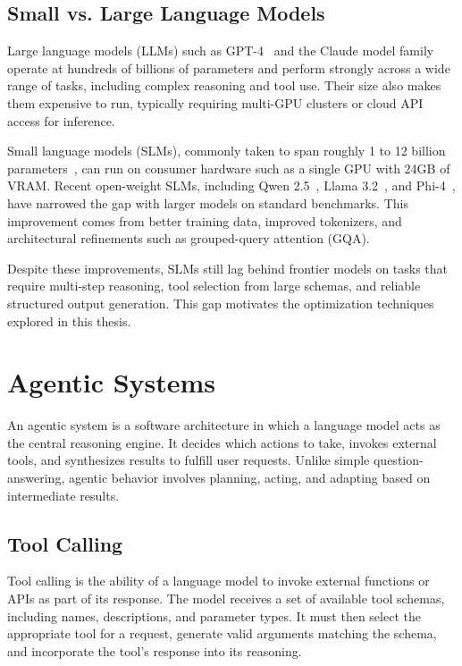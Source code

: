 \subsection{Small vs. Large Language Models}

Large language models (LLMs) such as GPT-4~\cite{openai2023gpt4} and the Claude model family operate at hundreds of billions of parameters and perform strongly across a wide range of tasks, including complex reasoning and tool use. Their size also makes them expensive to run, typically requiring multi-GPU clusters or cloud API access for inference.

Small language models (SLMs), commonly taken to span roughly 1 to 12 billion parameters~\cite{sharma2025slmagents}, can run on consumer hardware such as a single GPU with 24GB of VRAM. Recent open-weight SLMs, including Qwen 2.5~\cite{qwen2024qwen25}, Llama 3.2~\cite{metaai2024llama32}, and Phi-4~\cite{abdin2024phi}, have narrowed the gap with larger models on standard benchmarks. This improvement comes from better training data, improved tokenizers, and architectural refinements such as grouped-query attention (GQA).

Despite these improvements, SLMs still lag behind frontier models on tasks that require multi-step reasoning, tool selection from large schemas, and reliable structured output generation. This gap motivates the optimization techniques explored in this thesis.

\section{Agentic Systems}

An agentic system is a software architecture in which a language model acts as the central reasoning engine. It decides which actions to take, invokes external tools, and synthesizes results to fulfill user requests. Unlike simple question-answering, agentic behavior involves planning, acting, and adapting based on intermediate results.

\subsection{Tool Calling}

Tool calling is the ability of a language model to invoke external functions or APIs as part of its response. The model receives a set of available tool schemas, including names, descriptions, and parameter types. It must then select the appropriate tool for a request, generate valid arguments matching the schema, and incorporate the tool's response into its reasoning.

